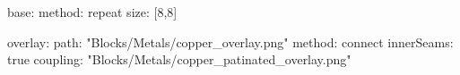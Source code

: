 base:
  method: repeat
  size: [8,8]
  
overlay:
  path: "Blocks/Metals/copper_overlay.png"
  method: connect
  innerSeams: true
  coupling: "Blocks/Metals/copper_patinated_overlay.png"